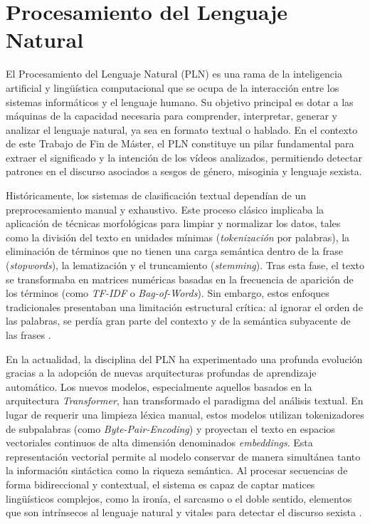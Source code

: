 \section{Procesamiento del Lenguaje Natural}
\label{sec:PLN}
El Procesamiento del Lenguaje Natural (PLN) es una rama de la inteligencia artificial y lingüística computacional que se ocupa de la interacción entre los sistemas informáticos y el lenguaje humano. Su objetivo principal es dotar a las máquinas de la capacidad necesaria para comprender, interpretar, generar y analizar el lenguaje natural, ya sea en formato textual o hablado. En el contexto de este Trabajo de Fin de Máster, el PLN constituye un pilar fundamental para extraer el significado y la intención de los vídeos analizados, permitiendo detectar patrones en el discurso asociados a sesgos de género, misoginia y lenguaje sexista. 

Históricamente, los sistemas de clasificación textual dependían de un preprocesamiento manual y exhaustivo. Este proceso clásico implicaba la aplicación de técnicas morfológicas para limpiar y normalizar los datos, tales como la división del texto en unidades mínimas (\textit{tokenización} por palabras), la eliminación de términos que no tienen una carga semántica dentro de la frase (\textit{stopwords}), la lematización y el truncamiento (\textit{stemming}). Tras esta fase, el texto se transformaba en matrices numéricas basadas en la frecuencia de aparición de los términos (como \textit{TF-IDF} o \textit{Bag-of-Words}). Sin embargo, estos enfoques tradicionales presentaban una limitación estructural crítica: al ignorar el orden de las palabras, se perdía gran parte del contexto y de la semántica subyacente de las frases \cite{li2022survey}.

En la actualidad, la disciplina del PLN ha experimentado una profunda evolución gracias a la adopción de nuevas arquitecturas profundas de aprendizaje automático. Los nuevos modelos, especialmente aquellos basados en la arquitectura \textit{Transformer}, han transformado el paradigma del análisis textual. En lugar de requerir una limpieza léxica manual, estos modelos utilizan tokenizadores de subpalabras (como \textit{Byte-Pair-Encoding}) y proyectan el texto en espacios vectoriales continuos de alta dimensión denominados \textit{embeddings}. Esta representación vectorial permite al modelo conservar de manera simultánea tanto la información sintáctica como la riqueza semántica. Al procesar secuencias de forma bidireccional y contextual, el sistema es capaz de captar matices lingüísticos complejos, como la ironía, el sarcasmo o el doble sentido, elementos que son intrínsecos al lenguaje natural y vitales para detectar el discurso sexista \cite{min2023recent}.

